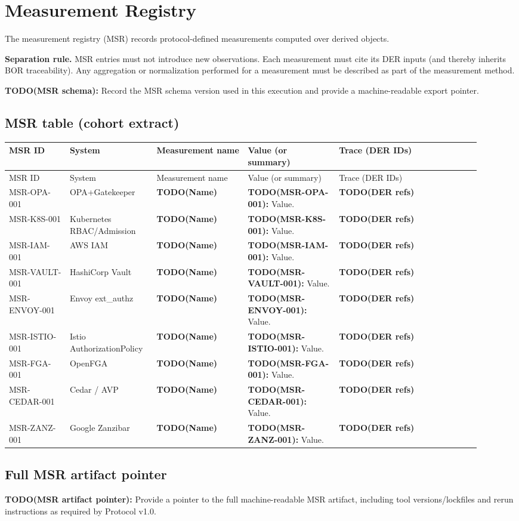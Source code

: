 \section{Measurement Registry}
\label{sec:msr}
The measurement registry (MSR) records protocol-defined measurements computed over derived objects.

\textbf{Separation rule.} MSR entries must not introduce new observations. Each measurement must cite its DER inputs (and thereby inherits BOR traceability). Any aggregation or normalization performed for a measurement must be described as part of the measurement method.

\textbf{TODO(MSR schema):} Record the MSR schema version used in this execution and provide a machine-readable export pointer.

\subsection{MSR table (cohort extract)}
\begin{center}
\begin{longtable}{@{}p{0.12\linewidth}p{0.16\linewidth}p{0.18\linewidth}p{0.18\linewidth}p{0.28\linewidth}@{}}
\toprule
MSR ID & System & Measurement name & Value (or summary) & Trace (DER IDs) \\
\midrule
\endfirsthead
\toprule
MSR ID & System & Measurement name & Value (or summary) & Trace (DER IDs) \\
\midrule
\endhead
\bottomrule
\endfoot
\bottomrule
\endlastfoot
MSR-OPA-001 & OPA+Gatekeeper & \textbf{TODO(Name)} & \textbf{TODO(MSR-OPA-001):} Value. & \textbf{TODO(DER refs)} \\
MSR-K8S-001 & Kubernetes RBAC/Admission & \textbf{TODO(Name)} & \textbf{TODO(MSR-K8S-001):} Value. & \textbf{TODO(DER refs)} \\
MSR-IAM-001 & AWS IAM & \textbf{TODO(Name)} & \textbf{TODO(MSR-IAM-001):} Value. & \textbf{TODO(DER refs)} \\
MSR-VAULT-001 & HashiCorp Vault & \textbf{TODO(Name)} & \textbf{TODO(MSR-VAULT-001):} Value. & \textbf{TODO(DER refs)} \\
MSR-ENVOY-001 & Envoy ext\_authz & \textbf{TODO(Name)} & \textbf{TODO(MSR-ENVOY-001):} Value. & \textbf{TODO(DER refs)} \\
MSR-ISTIO-001 & Istio AuthorizationPolicy & \textbf{TODO(Name)} & \textbf{TODO(MSR-ISTIO-001):} Value. & \textbf{TODO(DER refs)} \\
MSR-FGA-001 & OpenFGA & \textbf{TODO(Name)} & \textbf{TODO(MSR-FGA-001):} Value. & \textbf{TODO(DER refs)} \\
MSR-CEDAR-001 & Cedar / AVP & \textbf{TODO(Name)} & \textbf{TODO(MSR-CEDAR-001):} Value. & \textbf{TODO(DER refs)} \\
MSR-ZANZ-001 & Google Zanzibar & \textbf{TODO(Name)} & \textbf{TODO(MSR-ZANZ-001):} Value. & \textbf{TODO(DER refs)} \\
\end{longtable}
\end{center}

\subsection{Full MSR artifact pointer}
\textbf{TODO(MSR artifact pointer):} Provide a pointer to the full machine-readable MSR artifact, including tool versions/lockfiles and rerun instructions as required by Protocol v1.0.
